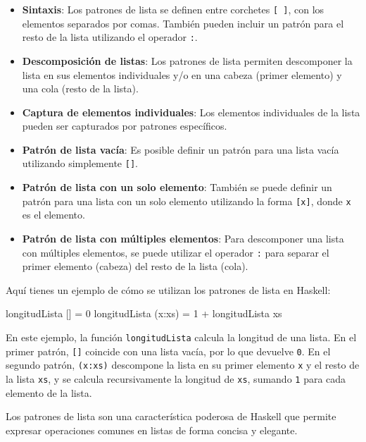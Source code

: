 \documentclass{article}
\begin{document}
\begin{itemize}
    \item \textbf{Sintaxis}: Los patrones de lista se definen entre corchetes \texttt{[ ]}, con los elementos separados por comas. También pueden incluir un patrón para el resto de la lista utilizando el operador \texttt{:}.
    
    \item \textbf{Descomposición de listas}: Los patrones de lista permiten descomponer la lista en sus elementos individuales y/o en una cabeza (primer elemento) y una cola (resto de la lista).
    
    \item \textbf{Captura de elementos individuales}: Los elementos individuales de la lista pueden ser capturados por patrones específicos.
    
    \item \textbf{Patrón de lista vacía}: Es posible definir un patrón para una lista vacía utilizando simplemente \texttt{[]}.
    
    \item \textbf{Patrón de lista con un solo elemento}: También se puede definir un patrón para una lista con un solo elemento utilizando la forma \texttt{[x]}, donde \texttt{x} es el elemento.
    
    \item \textbf{Patrón de lista con múltiples elementos}: Para descomponer una lista con múltiples elementos, se puede utilizar el operador \texttt{:} para separar el primer elemento (cabeza) del resto de la lista (cola).
\end{itemize}

Aquí tienes un ejemplo de cómo se utilizan los patrones de lista en Haskell:

\begin{haskell}[caption={Función que calcula la longitud de una lista}]
longitudLista [] = 0
longitudLista (x:xs) = 1 + longitudLista xs
\end{haskell}

En este ejemplo, la función \texttt{longitudLista} calcula la longitud de una lista. En el primer patrón, \texttt{[]} coincide con una lista vacía, por lo que devuelve \texttt{0}. En el segundo patrón, \texttt{(x:xs)} descompone la lista en su primer elemento \texttt{x} y el resto de la lista \texttt{xs}, y se calcula recursivamente la longitud de \texttt{xs}, sumando \texttt{1} para cada elemento de la lista.

Los patrones de lista son una característica poderosa de Haskell que permite expresar operaciones comunes en listas de forma concisa y elegante.
\end{document}
